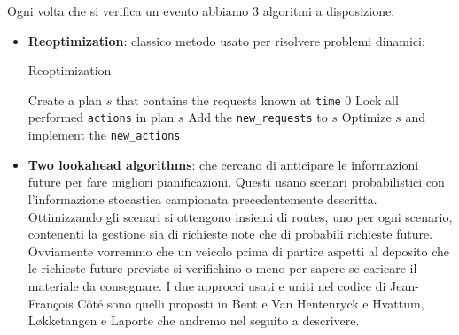 \documentclass[
    article,            %
    12pt,                %
    oneside,            %
    a4paper,            %
    english,            %
    italian,                %
    sumario=tradicional,
]{abntex2}
\begin{document}
Ogni volta che si verifica un evento abbiamo 3 algoritmi a disposizione:

\begin{itemize}
\item
  \textbf{Reoptimization}: classico metodo usato per risolvere problemi
  dinamici: 
  \begin{algorithm}
        \caption{Reoptimization}
        \label{alg:Reoptimization}
        \begin{algorithmic}
            \State Create a plan $s$ that contains the requests known at \texttt{time} $0$
                \State Lock all performed \texttt{actions} in plan $s$
                \State Add the \texttt{new\_requests} to $s$
                \State Optimize $s$ and implement the \texttt{new\_actions}
            \EndWhile
        \end{algorithmic}
    \end{algorithm}
 \item \textbf{Two lookahead algorithms}: che cercano di anticipare le informazioni future per fare migliori pianificazioni. Questi usano scenari probabilistici con l'informazione stocastica campionata precedentemente descritta. Ottimizzando gli scenari si ottengono insiemi di routes, uno per ogni scenario, contenenti la gestione sia di richieste note che di probabili richieste future. Ovviamente vorremmo che un veicolo prima di partire aspetti al deposito che le richieste future previste si verifichino o meno per sapere se caricare il materiale da consegnare. I due approcci usati e uniti nel codice di Jean-François Côté sono quelli proposti in Bent e Van Hentenryck\cite{SBPPDVR} e Hvattum, Løkketangen e Laporte \cite{BRH} che andremo nel seguito a descrivere.
\end{itemize}
\end{document}
